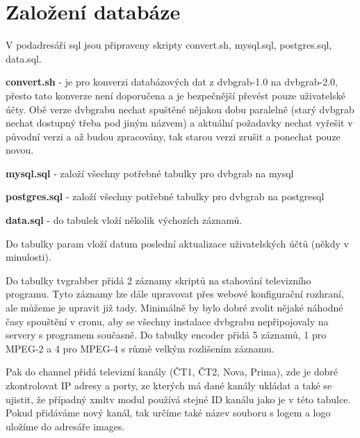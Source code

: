 \section{Založení databáze}

\vspace{10pt}

V podadresáři sql jsou připraveny skripty convert.sh, mysql.sql, postgres.sql, data.sql.

\vspace{10pt}

\textbf{convert.sh} - je pro konverzi databázových dat z dvbgrab-1.0 na dvbgrab-2.0, přesto tato konverze není doporučena a je bezpečnější převést pouze uživatelské účty. Obě verze dvbgrabu nechat spuštěné nějakou dobu paralelně (starý dvbgrab nechat dostupný třeba pod jiným názvem) a aktuální požadavky nechat vyřešit v původní verzi a až budou zpracovány, tak starou verzi zrušit a ponechat pouze novou.

\vspace{10pt}

\textbf{mysql.sql} - založí všechny potřebné tabulky pro dvbgrab na mysql

\vspace{10pt}

\textbf{postgres.sql} - založí všechny potřebné tabulky pro dvbgrab na postgresql

\vspace{10pt}

\textbf{data.sql} - do tabulek vloží několik výchozích záznamů. 

Do tabulky param vloží datum poslední aktualizace uživatelských účtů (někdy v minulosti). 

Do tabulky tvgrabber přidá 2 záznamy skriptů na stahování televizního programu. Tyto záznamy lze dále upravovat přes webové konfigurační rozhraní, ale můžeme je upravit již tady. Minimálně by bylo dobré zvolit nějaké náhodné časy spouštění v cronu, aby se všechny instalace dvbgrabu nepřipojovaly na servery s programem současně. Do tabulky encoder přidá 5 záznamů, 1 pro MPEG-2 a 4 pro MPEG-4 s různě velkým rozlišením záznamu. 

Pak do channel přidá televizní kanály (ČT1, ČT2, Nova, Prima), zde je dobré zkontrolovat IP adresy a porty, ze kterých má dané kanály ukládat a také se ujistit, že případný xmltv modul používá stejné ID kanálu jako je v této tabulce. Pokud přidáváme nový kanál, tak určíme také název souboru s logem a logo uložíme do adresáře images.

